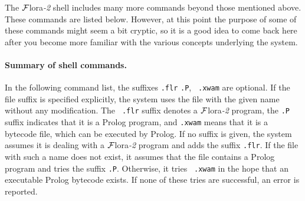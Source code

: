 \documentclass[11pt]{article}
\newcommand{\FLSYSTEM}{{\mbox{\sc ${\cal F}${lora}\rm\emph{-2}}}\xspace}
\newcommand{\flrext}{flr}
\newcommand{\ofile}{xwam}
\begin{document}
The \FLSYSTEM shell includes many more commands beyond those mentioned above.
These commands are listed below. However, at this point the purpose of some
of these commands might seem a bit cryptic, so it is a good idea to come
back here after you become more familiar with the various concepts
underlying the system.

\paragraph{Summary of shell commands.}
In the following command list, the suffixes {\tt .\flrext} {\tt .P}, {\tt
  .\ofile} are optional. If the file suffix is specified explicitly, the
system uses the file with the given name without any modification. The {\tt
  .\flrext} suffix denotes a \FLSYSTEM program, the {\tt .P} suffix indicates that
it is a Prolog program, and {\tt .\ofile} means that it is a bytecode file,
which can be executed by Prolog.  If no suffix is given, the system assumes it
is dealing with a \FLSYSTEM program and adds the suffix {\tt .\flrext}. If the
file with such a name does not exist, it assumes that the file contains a
Prolog program and tries the suffix {\tt .P}. Otherwise, it tries {\tt
  .\ofile} in the hope that an executable Prolog bytecode exists. If none of
these tries are successful, an error is reported.
%
\end{document}
